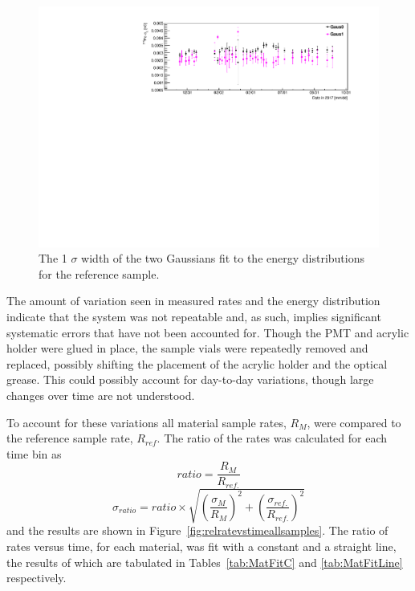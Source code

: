 \begin{figure}[h]
	\centering
	\includegraphics[width=0.9\linewidth]{tex/6-ac227-images/BNL/PoEnWidthVsTime_S2}
	\caption{The 1 $\sigma$ width of the two Gaussians fit to the \Po energy distributions for the reference sample.}
	\label{fig:poenwidthvstimes2}
\end{figure}

The amount of variation seen in measured rates and the \Po energy distribution indicate that the system was not repeatable and, as such, implies significant systematic errors that have not been accounted for. 
Though the PMT and acrylic holder were glued in place, the sample vials were repeatedly removed and replaced, possibly shifting the placement of the acrylic holder and the optical grease. 
This could possibly account for day-to-day variations, though large changes over time are not understood. 

To account for these variations all material sample rates, $R_M$, were compared to the reference sample rate, $R_{ref}$.
The ratio of the rates was calculated for each time bin as
\begin{equation}
ratio = \frac{R_M}{R_{ref.}}
\end{equation}
\begin{equation}
\sigma_{ratio} = ratio \times \sqrt{\left(\frac{\sigma_{M}}{R_{M}}\right)^2+\left(\frac{\sigma_{ref.}}{R_{ref.}}\right)^2}
\end{equation}
and the results are shown in Figure~\ref{fig:relratevstimeallsamples}.
The ratio of rates versus time, for each material, was fit with a constant and a straight line, the results of which are tabulated in Tables~\ref{tab:MatFitC} and \ref{tab:MatFitLine} respectively.

